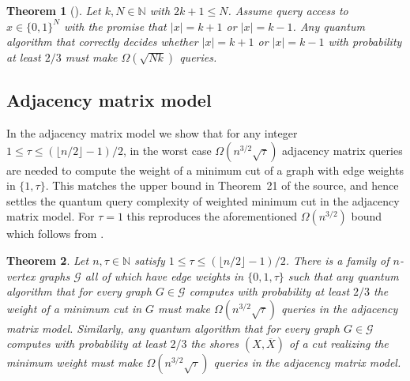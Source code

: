 \documentclass[10pt,a4paper]{article}
\newcommand{\N}{\mathbb{N}}
\newcommand{\Gcal}{\mathcal{G}}
\newcommand{\floor}[1]{\lfloor #1 \rfloor}
\newcommand{\1}{\mathbf{1}}
\newtheorem{theorem}{Theorem}
\theoremstyle{definition}
\begin{document}
\begin{theorem}[{\cite[Corollary 1.2]{NW99}}]
\label{thm:thresh}
Let $k,N \in \N$ with $2k+1 \le N$.  Assume query access to $x \in \{0,1\}^N$ with the promise that $|x| = k+1$ or $|x| = k-1$.  Any quantum algorithm that correctly decides whether $|x| = k+1$ or $|x| = k-1$ with probability at least $2/3$ must make $\Omega(\sqrt{N k})$ queries.
\end{theorem}

\subsection{Adjacency matrix model}

In the adjacency matrix model we show that for any integer $1 \le \tau \le (\floor{n/2}-1)/2$, in the worst case $\Omega( n^{3/2} \sqrt{\tau})$ adjacency matrix queries are needed to compute the weight of a minimum cut of a graph with edge weights in 
$\{1,\tau\}$.
This matches the upper bound in Theorem~21 of the source, and hence settles the quantum query complexity of weighted minimum cut in the adjacency matrix model.
For $\tau = 1$ this reproduces the aforementioned $\Omega(n^{3/2})$ bound which follows from \cite{DHHM06}.


\begin{theorem}
\label{thm:lower}
Let $n,\tau \in \N$ satisfy $1 \le \tau \le (\floor{n/2}-1)/2$.  There is a family of $n$-vertex graphs $\Gcal$ all of which have edge weights in $\{0,1,\tau\}$ 
such that any quantum algorithm that for every graph $G \in \Gcal$ computes with probability at least $2/3$ the weight of a minimum cut in $G$ must make 
$\Omega(n^{3/2}\sqrt{\tau})$ queries in the adjacency matrix model.  Similarly, any quantum algorithm that for every graph $G \in \Gcal$ computes with 
probability at least $2/3$ the shores $(X,\overline{X})$ of a cut realizing the minimum weight must make $\Omega(n^{3/2}\sqrt{\tau})$ queries in the adjacency matrix model.
\end{theorem}
\end{document}
